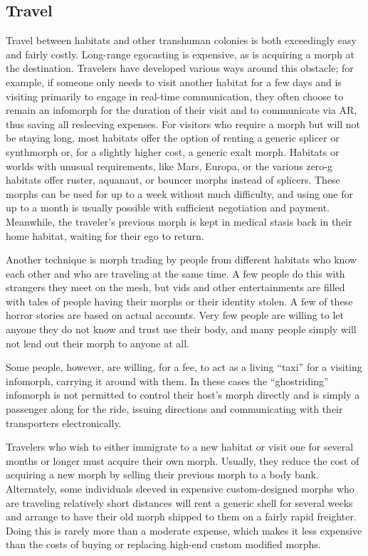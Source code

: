\subsection{Travel}

Travel between habitats and other transhuman colonies is both exceedingly easy and fairly costly. Long-range egocasting is expensive, as is acquiring a morph 
at the destination. Travelers have developed various 
ways around this obstacle; for example, if someone 
only needs to visit another habitat for a few days and 
is visiting primarily to engage in real-time communication, they often choose to remain an infomorph for 
the duration of their visit and to communicate via AR, 
thus saving all resleeving expenses. For visitors who 
require a morph but will not be staying long, most 
habitats offer the option of renting a generic splicer 
or synthmorph or, for a slightly higher cost, a generic 
exalt morph. Habitats or worlds with unusual requirements, like Mars, Europa, or the various zero-g 
habitats offer ruster, aquanaut, or bouncer morphs 
instead of splicers. These morphs can be used for up to 
a week without much difficulty, and using one for up 
to a month is usually possible with sufficient negotiation and payment. Meanwhile, the traveler's previous 
morph is kept in medical stasis back in their home 
habitat, waiting for their ego to return.

Another technique is morph trading by people from 
different habitats who know each other and who are 
traveling at the same time. A few people do this with 
strangers they meet on the mesh, but vids and other 
entertainments are filled with tales of people having 
their morphs or their identity stolen. A few of these 
horror stories are based on actual accounts. Very few 
people are willing to let anyone they do not know and 
trust use their body, and many people simply will not 
lend out their morph to anyone at all. 

Some people, however, are willing, for a fee, to act 
as a living ``taxi'' for a visiting infomorph, carrying 
it around with them. In these cases the ``ghostriding'' 
infomorph is not permitted to control their host's 
morph directly and is simply a passenger along for 
the ride, issuing directions and communicating with 
their transporters electronically.

Travelers who wish to either immigrate to a new 
habitat or visit one for several months or longer 
must acquire their own morph. Usually, they reduce 
the cost of acquiring a new morph by selling their 
previous morph to a body bank. Alternately, some 
individuals sleeved in expensive custom-designed 
morphs who are traveling relatively short distances 
will rent a generic shell for several weeks and arrange to have their old morph shipped to them on 
a fairly rapid freighter. Doing this is rarely more 
than a moderate expense, which makes it less expensive than the costs of buying or replacing high-end 
custom modified morphs.

